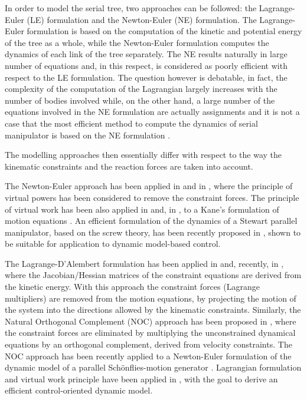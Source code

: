 \documentclass[]{interact}
\theoremstyle{plain}%
\theoremstyle{definition}
\theoremstyle{remark}
\begin{document}
In order to model the serial tree, two approaches can be followed: the Lagrange-Euler (LE) formulation and the Newton-Euler (NE) formulation. The Lagrange-Euler formulation is based on the computation of the kinetic and potential energy of the tree as a whole, while the Newton-Euler formulation computes the dynamics of each link of the tree separately. The NE results naturally in large number of equations and, in this respect, is considered as poorly efficient with respect to the LE formulation. The question however is debatable, in fact, the complexity of the computation of the Lagrangian largely increases with the number of bodies involved while, on the other hand, a large number of the equations involved in the NE formulation are actually assignments \cite{Elmqvist_methodsfor} and it is not a case that the most efficient method to compute the dynamics of serial manipulator is based on the NE formulation \cite{10.1115/1.3139699}.

The modelling approaches then essentially differ with respect to the way the kinematic constraints and the reaction forces are taken into account.

The Newton-Euler approach has been applied in \cite{DASGUPTA1998993} and in \cite{briot2015dynamics}, where the principle of virtual powers has been considered to remove the constraint forces. The principle of virtual work has been also applied in \cite{T2000} and, in \cite{JWY18}, to a Kane's formulation of motion equations \cite{doi:10.1177/027836498300200301,YANG2016350,LIEH1994357}. An efficient formulation of the dynamics of a Stewart parallel manipulator, based on the screw theory, has been recently proposed in \cite{HZZ2020}, shown to be suitable for application to dynamic model-based control.

The Lagrange-D'Alembert formulation has been applied in \cite{34765} and, recently, in \cite{A20}, where the Jacobian/Hessian matrices of the constraint equations are derived from the kinetic energy. With this approach the constraint forces (Lagrange multipliers) are removed from the motion equations, by projecting the motion of the system into the directions allowed by the kinematic constraints. Similarly, the Natural Orthogonal Complement (NOC) approach has been proposed in \cite{10.1115/1.3173642}, where the constraint forces are eliminated by multiplying the unconstrained dynamical equations by an orthogonal complement, derived from velocity constraints. The NOC approach has been recently applied to a Newton-Euler formulation of the dynamic model of a parallel Sch\"{o}nflies-motion generator \cite{KARIMIESKANDARY2018119}. Lagrangian formulation and virtual work principle have been applied in \cite{XDZ16}, with the goal to derive an efficient control-oriented dynamic model.
\end{document}
